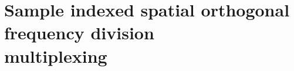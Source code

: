 \section[Sample indexed spatial orthogonal frequency division multiplexing]{Sample indexed spatial orthogonal frequency division\\ multiplexing}
\label{sec:sisofdm}

\graphicspath{{_MIMOSpace/figures_sisofdm/}}




